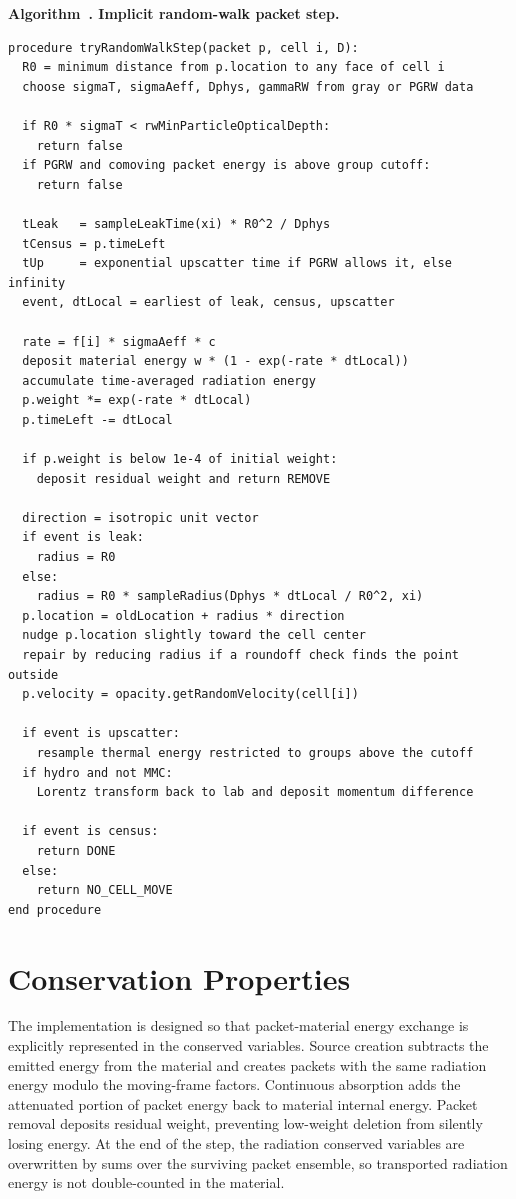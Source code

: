 \documentclass[11pt]{article}
\newcounter{algorithm}
\newcommand{\AlgorithmCaption}[2]{%
  \refstepcounter{algorithm}%
  \label{#1}%
  \par\medskip\noindent\textbf{Algorithm~\thealgorithm. #2}\par\nobreak\smallskip%
}
\begin{document}
\AlgorithmCaption{alg:rw}{Implicit random-walk packet step.}
\begin{verbatim}
procedure tryRandomWalkStep(packet p, cell i, D):
  R0 = minimum distance from p.location to any face of cell i
  choose sigmaT, sigmaAeff, Dphys, gammaRW from gray or PGRW data

  if R0 * sigmaT < rwMinParticleOpticalDepth:
    return false
  if PGRW and comoving packet energy is above group cutoff:
    return false

  tLeak   = sampleLeakTime(xi) * R0^2 / Dphys
  tCensus = p.timeLeft
  tUp     = exponential upscatter time if PGRW allows it, else infinity
  event, dtLocal = earliest of leak, census, upscatter

  rate = f[i] * sigmaAeff * c
  deposit material energy w * (1 - exp(-rate * dtLocal))
  accumulate time-averaged radiation energy
  p.weight *= exp(-rate * dtLocal)
  p.timeLeft -= dtLocal

  if p.weight is below 1e-4 of initial weight:
    deposit residual weight and return REMOVE

  direction = isotropic unit vector
  if event is leak:
    radius = R0
  else:
    radius = R0 * sampleRadius(Dphys * dtLocal / R0^2, xi)
  p.location = oldLocation + radius * direction
  nudge p.location slightly toward the cell center
  repair by reducing radius if a roundoff check finds the point outside
  p.velocity = opacity.getRandomVelocity(cell[i])

  if event is upscatter:
    resample thermal energy restricted to groups above the cutoff
  if hydro and not MMC:
    Lorentz transform back to lab and deposit momentum difference

  if event is census:
    return DONE
  else:
    return NO_CELL_MOVE
end procedure
\end{verbatim}

\section{Conservation Properties}

The implementation is designed so that packet-material energy exchange is
explicitly represented in the conserved variables. Source creation subtracts
the emitted energy from the material and creates packets with the same
radiation energy modulo the moving-frame factors. Continuous absorption adds
the attenuated portion of packet energy back to material internal energy.
Packet removal deposits residual weight, preventing low-weight deletion from
silently losing energy. At the end of the step, the radiation conserved
variables are overwritten by sums over the surviving packet ensemble, so
transported radiation energy is not double-counted in the material.
\end{document}
